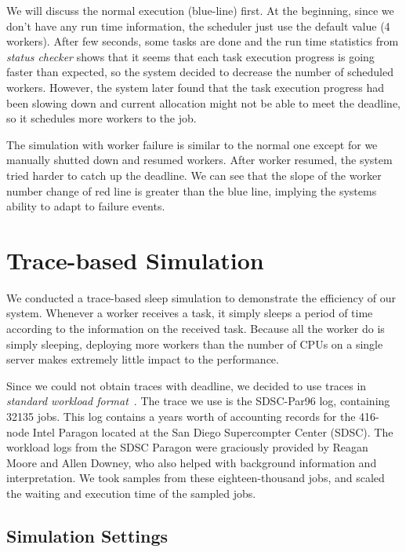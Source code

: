 We will discuss the normal execution (blue-line) first.
At the beginning, since we don't have any run time information, the
scheduler just use the default value (4 workers).
After few seconds, some tasks are done and the run time statistics from
\emph{status checker} shows that it seems that each task execution
progress is going faster than expected, so the system decided to
decrease the number of scheduled workers.
However, the system later found that the task execution progress had
been slowing down and current allocation might not be able to meet the
deadline, so it schedules more workers to the job.

The simulation with worker failure is similar to the normal one except
for we manually shutted down and resumed workers.
After worker resumed, the system tried harder to catch up the deadline.
We can see that the slope of the worker number change of red line is
greater than the blue line, implying the systems ability to adapt to
failure events.

\section{Trace-based Simulation}
We conducted a trace-based sleep simulation to demonstrate the
efficiency of our system.
Whenever a worker receives a task, it simply sleeps a period of time
according to the information on the received task.
Because all the worker do is simply sleeping, deploying more workers
than the number of CPUs on a single server makes extremely little impact
to the performance.

Since we could not obtain traces with deadline, we decided to use traces
in {\em standard workload format}~\cite{cite:swf}.
The trace we use is the SDSC-Par96 log, containing 32135 jobs.
This log contains a years worth of accounting records for the 416-node
Intel Paragon located at the San Diego Supercompter Center (SDSC).
The workload logs from the SDSC Paragon were graciously provided by
Reagan Moore and Allen Downey, who also helped with background
information and interpretation.
We took samples from these eighteen-thousand jobs, and scaled the
waiting and execution time of the sampled jobs.

\subsection{Simulation Settings}
